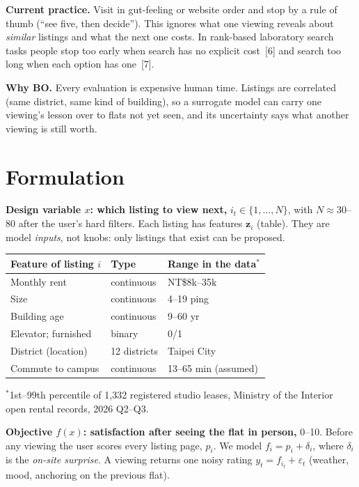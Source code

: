\documentclass[10pt,a4paper,twocolumn]{article}
\newcommand{\lead}[1]{\textbf{#1}}
\begin{document}
\lead{Current practice.} Visit in gut-feeling or website order and stop by a rule of thumb (``see five, then
decide''). This ignores what one viewing reveals about \emph{similar} listings and what the next one costs. In
rank-based laboratory search tasks people stop too early when search has no explicit cost~[6] and search too
long when each option has one~[7].

\lead{Why BO.} Every evaluation is expensive human time. Listings are correlated (same district, same kind of
building), so a surrogate model can carry one viewing's lesson over to flats not yet seen, and its uncertainty
says what another viewing is still worth.

\section{Formulation}

\lead{Design variable $x$: which listing to view next,} $i_t\in\{1,\dots,N\}$, with $N\approx30$--$80$ after
the user's hard filters. Each listing has features $\mathbf{z}_i$ (table). They are model \emph{inputs}, not
knobs: only listings that exist can be proposed.

\begin{center}\footnotesize
\begin{tabular}{@{}lll@{}}\toprule
Feature of listing $i$ & Type & Range in the data$^{*}$\\\midrule
Monthly rent & continuous & NT\$8k--35k\\
Size & continuous & 4--19 ping\\
Building age & continuous & 9--60 yr\\
Elevator; furnished & binary & 0/1\\
District (location) & 12 districts & Taipei City\\
Commute to campus & continuous & 13--65 min (assumed)\\\bottomrule
\end{tabular}

\smallskip
\parbox{0.97\columnwidth}{\scriptsize $^{*}$1st--99th percentile of 1,332 registered studio leases, Ministry
of the Interior open rental records, 2026 Q2--Q3.}
\end{center}

\lead{Objective $f(x)$: satisfaction after seeing the flat in person,} 0--10. Before any viewing the user
scores every listing page, $p_i$. We model $f_i=p_i+\delta_i$, where $\delta_i$ is the \emph{on-site
surprise}. A viewing returns one noisy rating $y_t=f_{i_t}+\varepsilon_t$ (weather, mood, anchoring on the
previous flat).
\end{document}
